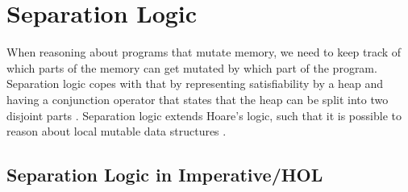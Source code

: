 \chapter{Separation Logic}\label{chapter:separation-logic}

When reasoning about programs that mutate memory, we need to keep track of which parts of the memory can get mutated by which part of the program. Separation logic copes with that by representing satisfiability by a heap and having a conjunction operator that states that the heap can be split into two disjoint parts \parencite{Calcagno2007}. Separation logic extends Hoare's logic, such that it is possible to reason about local mutable data structures \parencite{Reynolds}.

\section{Separation Logic in Imperative/HOL}\label{section:separation-logic-hol}

